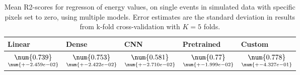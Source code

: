 \begin{table}
\centering
\caption{
Mean R2-scores for regresson of energy values, on single events in simulated data with specific pixels
set to zero, using multiple models. 
Error estimates are the standard deviation in results from k-fold cross-validation 
with $K=5$ folds.
}
\label{tab:regression-simulated-single-energy-pixelmod-r2}
\begin{tabular}{lllll}
\toprule
                                             Linear &                                               Dense &                                                 CNN &                                         Pretrained &                                              Custom \\
\midrule
 $\underset{\num{+- 2.459e-02 }  }{\num{ 0.739 } }$ &  $\underset{\num{+- 2.422e-02 }  }{\num{ 0.753 } }$ &  $\underset{\num{+- 2.710e-02 }  }{\num{ 0.581 } }$ &  $\underset{\num{+- 1.999e-02 }  }{\num{ 0.77 } }$ &  $\underset{\num{+- 4.327e-01 }  }{\num{ 0.778 } }$ \\
\bottomrule
\end{tabular}
\end{table}
